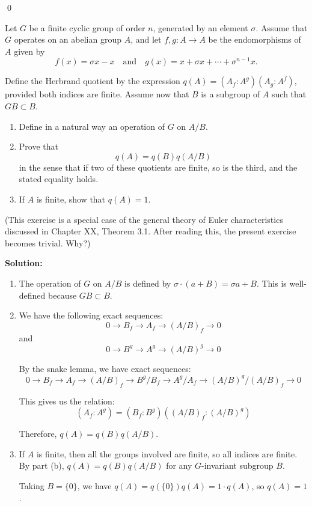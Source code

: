 \qed
\begin{problembox}
Let $G$ be a finite cyclic group of order $n$, generated by an element $\sigma$. Assume that $G$ operates on an abelian group $A$, and let $f, g : A \to A$ be the endomorphisms of $A$ given by
\[f(x) = \sigma x - x \quad \text{and} \quad g(x) = x + \sigma x + \cdots + \sigma^{n-1}x.\]

Define the Herbrand quotient by the expression $q(A) = (A_f : A^g)(A_g : A^f)$, provided both indices are finite. Assume now that $B$ is a subgroup of $A$ such that $GB \subset B$.
\begin{enumerate}[label=(\alph*)]
\item Define in a natural way an operation of $G$ on $A/B$.
\item Prove that
\[q(A) = q(B)q(A/B)\]
in the sense that if two of these quotients are finite, so is the third, and the stated equality holds.
\item If $A$ is finite, show that $q(A) = 1$.
\end{enumerate}
(This exercise is a special case of the general theory of Euler characteristics discussed in Chapter XX, Theorem 3.1. After reading this, the present exercise becomes trivial. Why?)
\end{problembox}

\noindent\textbf{Solution:}
\begin{enumerate}[label=(\alph*)]
\item The operation of $G$ on $A/B$ is defined by $\sigma \cdot (a + B) = \sigma a + B$. This is well-defined because $GB \subset B$.

\item We have the following exact sequences:
\[0 \to B_f \to A_f \to (A/B)_f \to 0\]
and
\[0 \to B^g \to A^g \to (A/B)^g \to 0\]

By the snake lemma, we have exact sequences:
\[0 \to B_f \to A_f \to (A/B)_f \to B^g/B_f \to A^g/A_f \to (A/B)^g/(A/B)_f \to 0\]

This gives us the relation:
\[(A_f : A^g) = (B_f : B^g)((A/B)_f : (A/B)^g)\]

Therefore, $q(A) = q(B)q(A/B)$.

\item If $A$ is finite, then all the groups involved are finite, so all indices are finite. By part (b), $q(A) = q(B)q(A/B)$ for any $G$-invariant subgroup $B$.

Taking $B = \{0\}$, we have $q(A) = q(\{0\})q(A) = 1 \cdot q(A)$, so $q(A) = 1$.
\end{enumerate}


